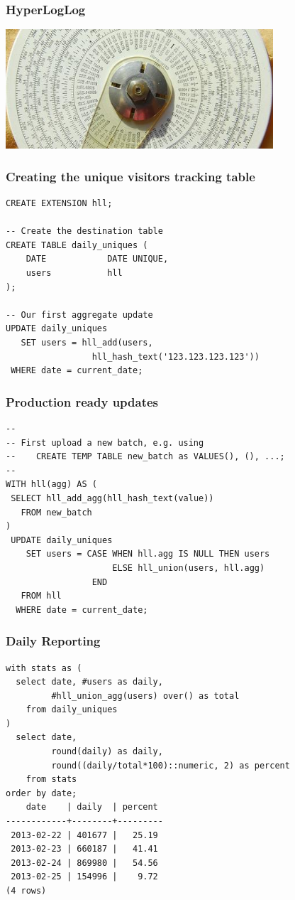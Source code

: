 \documentclass{beamer}
\begin{document}
\begin{frame}[fragile]
  \frametitle{HyperLogLog}

  \vfill

\begin{center}
  \includegraphics[height=12em]{cardinality1.jpg}
\end{center}
\end{frame}

\begin{frame}[fragile]
  \frametitle{Creating the unique visitors tracking table}

\begin{verbatim}
CREATE EXTENSION hll;

-- Create the destination table
CREATE TABLE daily_uniques (
    DATE            DATE UNIQUE,
    users           hll
);

-- Our first aggregate update
UPDATE daily_uniques
   SET users = hll_add(users,
                 hll_hash_text('123.123.123.123'))
 WHERE date = current_date;
\end{verbatim}  
\end{frame}

\begin{frame}[fragile]
  \frametitle{Production ready updates}

\begin{verbatim}
--
-- First upload a new batch, e.g. using
--    CREATE TEMP TABLE new_batch as VALUES(), (), ...;
--
WITH hll(agg) AS (
 SELECT hll_add_agg(hll_hash_text(value))
   FROM new_batch
)
 UPDATE daily_uniques
    SET users = CASE WHEN hll.agg IS NULL THEN users
                     ELSE hll_union(users, hll.agg)
                 END
   FROM hll
  WHERE date = current_date;
\end{verbatim}  
\end{frame}

\begin{frame}[fragile]
  \frametitle{Daily Reporting}

\begin{verbatim}
with stats as (
  select date, #users as daily,
         #hll_union_agg(users) over() as total
    from daily_uniques
)
  select date,
         round(daily) as daily,
         round((daily/total*100)::numeric, 2) as percent
    from stats
order by date;
    date    | daily  | percent 
------------+--------+---------
 2013-02-22 | 401677 |   25.19
 2013-02-23 | 660187 |   41.41
 2013-02-24 | 869980 |   54.56
 2013-02-25 | 154996 |    9.72
(4 rows)
\end{verbatim}  
\end{frame}
\end{document}
